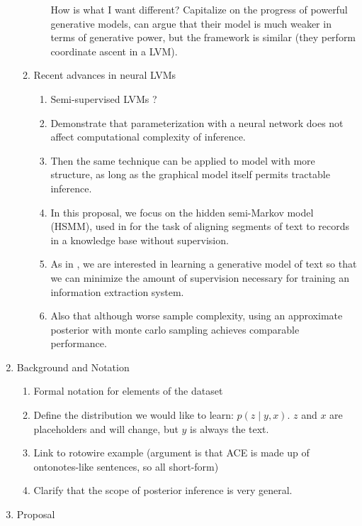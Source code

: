 \documentclass[11pt]{article}
\begin{document}
\begin{enumerate}
\begin{enumerate}
\begin{enumerate}
            How is what I want different? Capitalize on the progress of powerful generative models,
            can argue that their model is much weaker in terms of generative power,
            but the framework is similar (they perform coordinate ascent in a LVM).
        \end{enumerate}
    \item Recent advances in neural LVMs
        \begin{enumerate}
        \item Semi-supervised LVMs \citet{kingma2014ssvae}?
        \item Demonstrate that parameterization with a neural network does not affect computational
            complexity of inference.
        \item Then the same technique can be applied to model with more structure,
            as long as the graphical model itself permits tractable inference.
        \item In this proposal, we focus on the hidden semi-Markov model (HSMM),
            used in \citet{liang2009semalign} for the task of aligning segments of text to
            records in a knowledge base without supervision. 
        \item As in \citet{liang2009semalign}, we are interested in learning a generative model of text so that
            we can minimize the amount of supervision necessary for training an
            information extraction system.
        \item Also that although worse sample complexity, using an approximate posterior
            with monte carlo sampling achieves comparable performance.
        \end{enumerate}
    \end{enumerate}
\item Background and Notation
    \begin{enumerate}
    \item Formal notation for elements of the dataset
    \item Define the distribution we would like to learn: $p(z\mid y, x)$.
        $z$ and $x$ are placeholders and will change, but $y$ is always the text.
    \item Link to rotowire example
        (argument is that ACE is made up of ontonotes-like sentences, so all short-form)
    \item Clarify that the scope of posterior inference is very general.
    \end{enumerate}
\item Proposal

\end{enumerate}
\end{document}
